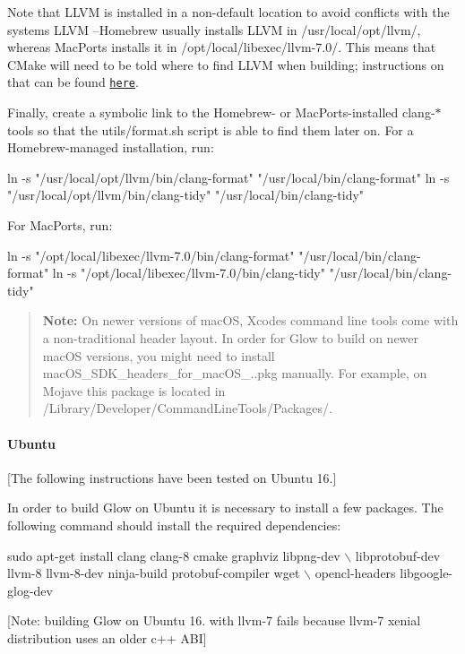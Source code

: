 Note that L\+L\+VM is installed in a non-\/default location to avoid conflicts with the system\textquotesingle{}s L\+L\+VM --Homebrew usually installs L\+L\+VM in {\ttfamily /usr/local/opt/llvm/}, whereas Mac\+Ports installs it in {\ttfamily /opt/local/libexec/llvm-\/7.0/}. This means that C\+Make will need to be told where to find L\+L\+VM when building; instructions on that can be found \href{#building-with-dependencies-llvm}{\tt here}.

Finally, create a symbolic link to the Homebrew-\/ or Mac\+Ports-\/installed {\ttfamily clang-\/$\ast$} tools so that the {\ttfamily utils/format.\+sh} script is able to find them later on. For a Homebrew-\/managed installation, run\+: 
\begin{DoxyCode}
ln -s "/usr/local/opt/llvm/bin/clang-format" "/usr/local/bin/clang-format"
ln -s "/usr/local/opt/llvm/bin/clang-tidy" "/usr/local/bin/clang-tidy"
\end{DoxyCode}
 For Mac\+Ports, run\+: 
\begin{DoxyCode}
ln -s "/opt/local/libexec/llvm-7.0/bin/clang-format" "/usr/local/bin/clang-format"
ln -s "/opt/local/libexec/llvm-7.0/bin/clang-tidy" "/usr/local/bin/clang-tidy"
\end{DoxyCode}


\begin{quote}
{\bfseries Note\+:} On newer versions of mac\+OS, Xcode\textquotesingle{}s command line tools come with a non-\/traditional header layout. In order for Glow to build on newer mac\+OS versions, you might need to install {\ttfamily mac\+O\+S\+\_\+\+S\+D\+K\+\_\+headers\+\_\+for\+\_\+mac\+O\+S\+\_..\+pkg} manually. For example, on Mojave this package is located in {\ttfamily /\+Library/\+Developer/\+Command\+Line\+Tools/\+Packages/}. \end{quote}


\paragraph*{Ubuntu}

\mbox{[}The following instructions have been tested on Ubuntu 16.\mbox{]}

In order to build Glow on Ubuntu it is necessary to install a few packages. The following command should install the required dependencies\+:


\begin{DoxyCode}
sudo apt-get install clang clang-8 cmake graphviz libpng-dev \(\backslash\)
    libprotobuf-dev llvm-8 llvm-8-dev ninja-build protobuf-compiler wget \(\backslash\)
    opencl-headers libgoogle-glog-dev
\end{DoxyCode}
 \mbox{[}Note\+: building Glow on Ubuntu 16. with llvm-\/7 fails because llvm-\/7 xenial distribution uses an older c++ A\+BI\mbox{]}

